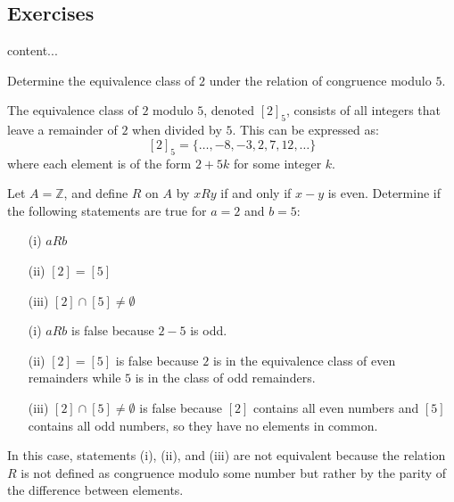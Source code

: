 \subsection{Exercises}

\begin{exercise}
	content...
\end{exercise}
\begin{exercise}
		Determine the equivalence class of \( 2 \) under the relation of congruence modulo \( 5 \).
\end{exercise}
	\begin{solution}
		The equivalence class of \( 2 \) modulo \( 5 \), denoted \( [2]_5 \), consists of all integers that leave a remainder of \( 2 \) when divided by \( 5 \). This can be expressed as:
		\[ [2]_5 = \{ \ldots, -8, -3, 2, 7, 12, \ldots \} \]
		where each element is of the form \( 2 + 5k \) for some integer \( k \).
	\end{solution}


\begin{exercise}
	Let \( A = \mathbb{Z} \), and define \( R \) on \( A \) by \( xRy \) if and only if \( x - y \) is even. Determine if the following statements are true for \( a = 2 \) and \( b = 5 \):
	\begin{enumerate}
		\item[(i)] \( aRb \)
		\item[(ii)] \( [2] = [5] \)
		\item[(iii)] \( [2] \cap [5] \neq \emptyset \)
	\end{enumerate}
\end{exercise}

\begin{solution}
	\begin{enumerate}
		\item[(i)] \( aRb \) is false because \( 2 - 5 \) is odd.
		\item[(ii)] \( [2] = [5] \) is false because \( 2 \) is in the equivalence class of even remainders while \( 5 \) is in the class of odd remainders.
		\item[(iii)] \( [2] \cap [5] \neq \emptyset \) is false because \( [2] \) contains all even numbers and \( [5] \) contains all odd numbers, so they have no elements in common.
	\end{enumerate}
	In this case, statements (i), (ii), and (iii) are not equivalent because the relation \( R \) is not defined as congruence modulo some number but rather by the parity of the difference between elements.
\end{solution}

